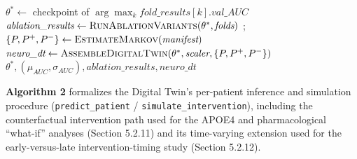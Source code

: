 \documentclass[pdflatex,sn-mathphys-num]{sn-jnl}%
\theoremstyle{thmstyleone}%
\theoremstyle{thmstyletwo}%
\theoremstyle{thmstylethree}%
\begin{document}
\begin{algorithm}
\begin{algorithmic}[1]
\State $\theta^* \gets$ checkpoint of $\arg\max_k \textit{fold\_results}[k].\textit{val\_AUC}$ 
\State $\textit{ablation\_results} \gets \Call{RunAblationVariants}{\theta^*, \textit{folds}}$ 
\State {};  
\State $\{P, P^+, P^-\} \gets \Call{EstimateMarkov}{\textit{manifest}}$ 
\State $\textit{neuro\_dt} \gets \Call{AssembleDigitalTwin}{\theta^*, \textit{scaler}, \{P, P^+, P^-\}}$ 
\State \Return $\theta^*, (\mu_{\textit{AUC}}, \sigma_{\textit{AUC}}), \textit{ablation\_results}, \textit{neuro\_dt}$
\end{algorithmic}
\end{algorithm}

\textbf{Algorithm 2} formalizes the Digital Twin's per-patient inference and simulation procedure (\texttt{predict\_patient} / \texttt{simulate\_intervention}), including the counterfactual intervention path used for the APOE4 and pharmacological ``what-if'' analyses (Section 5.2.11) and its time-varying extension used for the early-versus-late intervention-timing study (Section 5.2.12).
\end{document}

